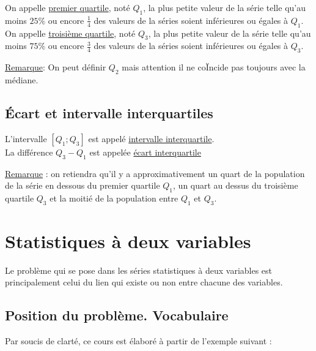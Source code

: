 \documentclass[french]{book}
\begin{document}
\begin{defn}
On appelle \underline{premier quartile}, noté $Q_1$, la plus petite valeur de la série telle qu'au moins $25\% $ ou encore $\frac{1}{4}$ des valeurs de la séries soient inférieures ou égales à $Q_1$.\\

On appelle \underline{troisième quartile}, noté $Q_3$, la plus petite valeur de la série telle qu'au moins $75\% $ ou encore $\frac{3}{4}$ des valeurs de la séries soient inférieures ou égales à $Q_3$.
\end{defn}

\underline{Remarque}: On peut définir $Q_2$ mais attention il ne coÏncide pas toujours avec la médiane.\\

\section{Écart et intervalle interquartiles}

\begin{defn}
L'intervalle $[Q_1;Q_3]$ est appelé \underline{intervalle interquartile}.\\
La différence $Q_3-Q_1$ est appelée \underline{écart interquartile}
\end{defn}

\underline{Remarque} : on retiendra qu'il y a approximativement un quart de la population de la série en dessous du premier quartile $Q_1$, un quart au dessus du troisième quartile $Q_3$ et la moitié de la population entre $Q_1$ et $Q_3$. 


\chapter{Statistiques à deux variables}
Le problème qui se pose dans les séries statistiques à deux variables est principalement celui du lien qui existe ou non entre chacune des variables. 
\section{Position du problème. Vocabulaire}

Par soucis de clarté, ce cours est élaboré à partir de l'exemple suivant :
\end{document}
